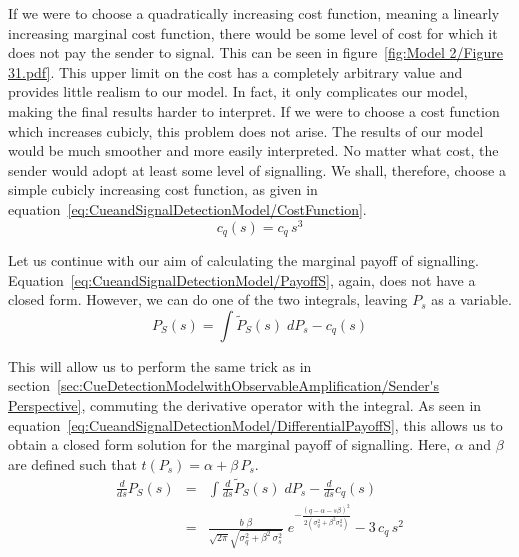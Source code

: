 \documentclass[a4paper,12pt]{article}
\numberwithin{equation}{section}
\begin{document}
If we were to choose a quadratically increasing cost function, meaning a linearly increasing marginal cost function, there would be some level of cost for which it does not pay the sender to signal. This can be seen in figure~\ref{fig:Model 2/Figure 31.pdf}. This upper limit on the cost has a completely arbitrary value and provides little realism to our model. In fact, it only complicates our model, making the final results harder to interpret. If we were to choose a cost function which increases cubicly, this problem does not arise. The results of our model would be much smoother and more easily interpreted. No matter what cost, the sender would adopt at least some level of signalling. We shall, therefore, choose a simple cubicly increasing cost function, as given in equation~\ref{eq:CueandSignalDetectionModel/CostFunction}.
\begin{equation}
\label{eq:CueandSignalDetectionModel/CostFunction}
c_{q}(s)=c_{q} \, s^{3}
\end{equation}

Let us continue with our aim of calculating the marginal payoff of signalling. Equation~\ref{eq:CueandSignalDetectionModel/PayoffS}, again, does not have a closed form. However, we can do one of the two integrals, leaving $P_{s}$ as a variable.
\begin{equation}
\label{eq:CueandSignalDetectionModel/SlicedPayoffS}
P_{S}(s) = \displaystyle \int \tilde{P}_{S}(s) \; dP_{s}-c_{q}(s)
\end{equation}

This will allow us to perform the same trick as in section~\ref{sec:CueDetectionModelwithObservableAmplification/Sender's Perspective}, commuting the derivative operator with the integral. As seen in equation~\ref{eq:CueandSignalDetectionModel/DifferentialPayoffS}, this allows us to obtain a closed form solution for the marginal payoff of signalling. Here, $\alpha$ and $\beta$ are defined such that $t(P_{s})=\alpha+\beta \, P_{s}$.
\begin{equation}
\label{eq:CueandSignalDetectionModel/DifferentialPayoffS}
\begin{array}{rcl}
\frac{d}{ds} P_{S}(s) &=& \displaystyle \int \frac{d}{ds} \tilde{P}_{S}(s) \; dP_{s} - \frac{d}{ds} c_{q}(s)\\[3mm]
&=& \displaystyle \frac{b \; \beta}{\sqrt{2 \pi} \sqrt{\sigma_{q}^{2} + \beta^2 \, \sigma_{s}^{2}}} \; e^{-\frac{(q-\alpha-s \beta)^{2}}{2(\sigma_{q}^{2}+\beta^{2} \sigma_{s}^{2})}} - 3 \, c_{q} \, s^2
\end{array}
\end{equation}
\end{document}

